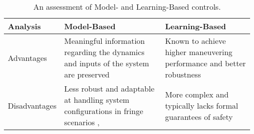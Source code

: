 \begin{comment} 
    Learning-based controllers have been known to achieve higher levels of performance with respect to more complex actions, typically at the cost of computational efficiency and/or formal guarantees of safety for the robot's behavior \cite{brunke_safe_2022}. Since the formulation of $\mathbf{g(x,u)}$ and $u_{\text{learned}}$ is handled by the learning medium, we are left without the ability to extract detailed functional information regarding either of them. 
\end{comment}
\begin{table}[h!]
    \centering
    \begin{tabularx}{\textwidth}{
        >{\hsize=0.2\hsize\centering\arraybackslash}X|
        >{\hsize=0.4\hsize\centering\arraybackslash}X|
        >{\hsize=0.4\hsize\centering\arraybackslash}X
        }
        Analysis        & Model-Based & Learning-Based\\ \hline\hline
        \raggedleft Advantages      & 
        Meaningful information regarding the dynamics and inputs of the system are preserved &
        Known to achieve higher maneuvering performance and better robustness\newline
        \cite{rakhmatillaev_integrative_2025}\\ \hline
        \raggedleft Disadvantages   &
        Less robust and adaptable at handling system configurations in fringe scenarios\newline
        \cite{rakhmatillaev_integrative_2025}, \cite{brunke_safe_2022} &
        More complex and typically lacks formal guarantees of safety\newline
        \cite{brunke_safe_2022}\\
    \end{tabularx}
    \caption{An assessment of Model- and Learning-Based controls.}
    \label{comparison}
\end{table}